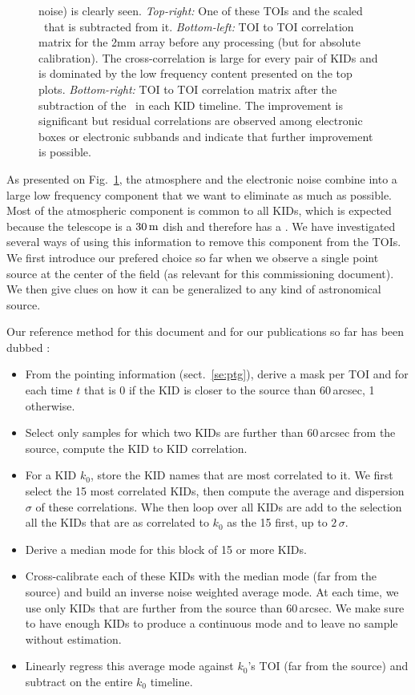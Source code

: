 \begin{figure}[ht!]
\begin{center}
{  noise) is clearly seen. \emph{Top-right:} One of these TOIs and the scaled
  \cm\ that is subtracted from it. \emph{Bottom-left:} TOI to TOI correlation
  matrix for the 2mm array before any processing (but for absolute
  calibration). The cross-correlation is large for every pair of KIDs and is
  dominated by the low frequency content presented on the top
  plots. \emph{Bottom-right:} TOI to TOI correlation matrix after the
  subtraction of the \cm\ in each KID timeline. The improvement is significant
  but residual correlations are observed among electronic boxes or electronic
  subbands and indicate that further improvement is possible.}
\label{fig:nika_toi}
\end{center}
\end{figure}

As presented on Fig.~\ref{fig:nika_toi}, the atmosphere and the electronic noise
combine into a large low frequency component that we want to eliminate as much
as possible. Most of the atmospheric component is common to all KIDs, which is
expected because the telescope is a $30\,\rm{m}$ dish and therefore has a . We have investigated several ways of using this
information to remove this component from the TOIs. We first introduce our
prefered choice so far when we observe a single point source at the center of
the field (as relevant for this commissioning document). We then give clues on
how it can be generalized to any kind of astronomical source.

Our reference method for this document and for our publications so far has been
dubbed \cmoneb:

\begin{itemize}
\item From the pointing information (sect.~\ref{se:ptg}), derive a mask per TOI
  and for each time $t$ that is 0 if the KID is closer to the source than 60\,arcsec, 1
  otherwise.
\item Select only samples for which two KIDs are further than 60\,arcsec from the source, compute
  the KID to KID correlation.
\item For a KID $k_0$, store the KID names that are most
  correlated to it. We first select the 15 most correlated KIDs, then compute
  the average and dispersion $\sigma$ of these correlations. Whe then loop over all KIDs
  are add to the selection all the KIDs that are as correlated to $k_0$ as the
  15 first, up to $2\,\sigma$.
\item Derive a median mode for this block of 15 or more KIDs.
\item Cross-calibrate each of these KIDs with the median mode (far from the
  source) and build an inverse noise weighted average mode. At each time, we use
  only KIDs that are further from the source than 60\,arcsec. We make sure to
  have enough KIDs to produce a continuous mode and to leave no sample without
  estimation.
\item Linearly regress this average mode against $k_0$'s TOI (far from the
  source) and subtract on the entire $k_0$ timeline.
\end{itemize}

